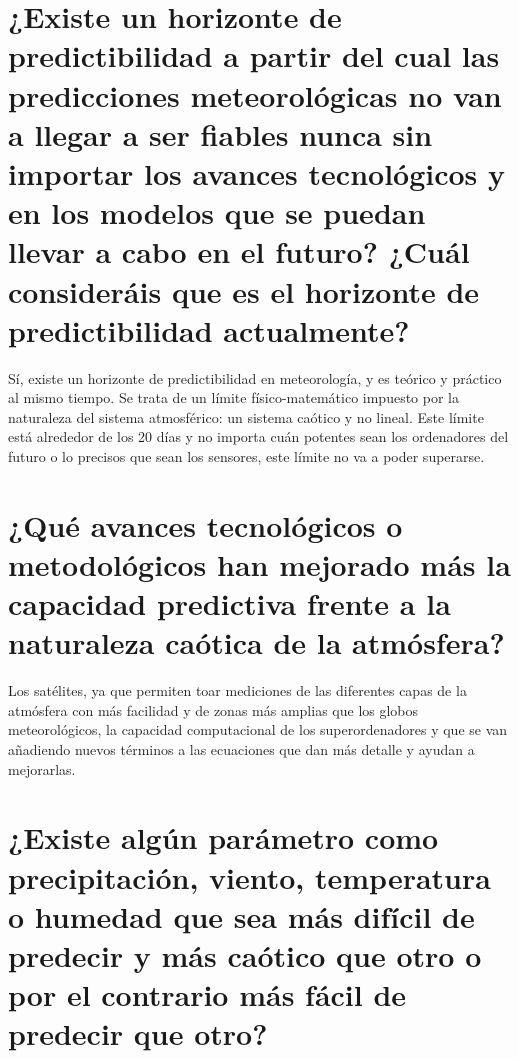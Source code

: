 \documentclass[
  11pt,
  a4paper,
  DIV=11,
  numbers=noendperiod]{scrreprt}
\begin{document}
\section{¿Existe un horizonte de predictibilidad a partir del cual las
predicciones meteorológicas no van a llegar a ser fiables nunca sin
importar los avances tecnológicos y en los modelos que se puedan llevar
a cabo en el futuro? ¿Cuál consideráis que es el horizonte de
predictibilidad
actualmente?}\label{existe-un-horizonte-de-predictibilidad-a-partir-del-cual-las-predicciones-meteoroluxf3gicas-no-van-a-llegar-a-ser-fiables-nunca-sin-importar-los-avances-tecnoluxf3gicos-y-en-los-modelos-que-se-puedan-llevar-a-cabo-en-el-futuro-cuuxe1l-consideruxe1is-que-es-el-horizonte-de-predictibilidad-actualmente}

Sí, existe un horizonte de predictibilidad en meteorología, y es teórico
y práctico al mismo tiempo. Se trata de un límite físico-matemático
impuesto por la naturaleza del sistema atmosférico: un sistema caótico y
no lineal. Este límite está alrededor de los 20 días y no importa cuán
potentes sean los ordenadores del futuro o lo precisos que sean los
sensores, este límite no va a poder superarse.

\section{¿Qué avances tecnológicos o metodológicos han mejorado más la
capacidad predictiva frente a la naturaleza caótica de la
atmósfera?}\label{quuxe9-avances-tecnoluxf3gicos-o-metodoluxf3gicos-han-mejorado-muxe1s-la-capacidad-predictiva-frente-a-la-naturaleza-cauxf3tica-de-la-atmuxf3sfera}

Los satélites, ya que permiten toar mediciones de las diferentes capas
de la atmósfera con más facilidad y de zonas más amplias que los globos
meteorológicos, la capacidad computacional de los superordenadores y que
se van añadiendo nuevos términos a las ecuaciones que dan más detalle y
ayudan a mejorarlas.

\section{¿Existe algún parámetro como precipitación, viento, temperatura
o humedad que sea más difícil de predecir y más caótico que otro o por
el contrario más fácil de predecir que
otro?}\label{existe-alguxfan-paruxe1metro-como-precipitaciuxf3n-viento-temperatura-o-humedad-que-sea-muxe1s-difuxedcil-de-predecir-y-muxe1s-cauxf3tico-que-otro-o-por-el-contrario-muxe1s-fuxe1cil-de-predecir-que-otro}
\end{document}
